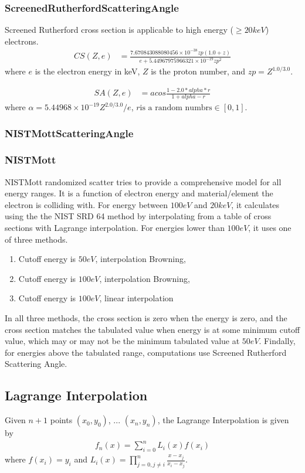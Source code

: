 \subsection{ScreenedRutherfordScatteringAngle}
Screened Rutherford cross section is applicable to high energy ($\geq 20keV$) electrons. 
\begin{align*}
   CS(Z, e) &= \frac{7.670843088080456\times 10^{-38} zp (1.0 + z)}{e + 5.44967975966321\times 10^{-19} zp^2}
\end{align*}
where $e$ is the electron energy in keV, $Z$ is the proton number, and $zp = Z^{1.0/3.0}$.

\begin{align*}
    SA(Z, e) &= acos\frac{1 - 2.0 * alpha * r}{1 + alpha - r}
\end{align*}
where $\alpha = 5.44968\times 10^{-19} Z^{2.0 / 3.0} / e$, $r \text{is a random numbrs} \in [0, 1]$.

\subsection{NISTMottScatteringAngle}
\subsection{NISTMott}
NISTMott randomized scatter tries to provide a comprehensive model for all energy ranges. It is a function of electron energy and material/element the electron is colliding with. For energy between $100eV$ and $20keV$, it calculates using the the NIST SRD 64 method by interpolating from a table of cross sections with Lagrange interpolation. For energies lower than $100eV$, it uses one of three methods. 
\begin{enumerate}
\item Cutoff energy is $50 eV$, interpolation Browning,
\item Cutoff energy is $100 eV$, interpolation Browning,
\item Cutoff energy is $100 eV$, linear interpolation
\end{enumerate}
In all three methods, the cross section is zero when the energy is zero, and the cross section matches the tabulated value when energy is at some minimum cutoff value, which may or may not be the minimum tabulated value at $50eV$. Findally, for energies above the tabulated range, computations use Screened Rutherford Scattering Angle.

\begin{appendices}
\chapter{Lagrange Interpolation}
Given $n+1$ points $(x_0, y_0)$, ... $(x_n, y_n)$, the Lagrange Interpolation is given by 
\begin{align*}
    f_n(x) = \sum^{n}_{i=0} L_i(x)f(x_i)
\end{align*}
where $f(x_i) = y_i$ and $L_i(x)=\prod_{j=0,j\ne i}^{n}\frac{x-x_j}{x_i-x_j}$.
\end{appendices}

